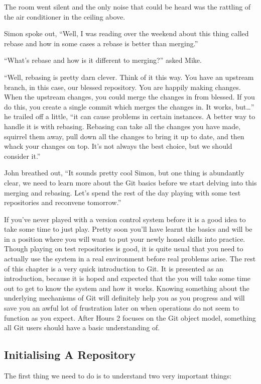 \begin{trenches}
The room went silent and the only noise that could be heard was the rattling of the air conditioner in the ceiling above.

Simon spoke out, ``Well, I was reading over the weekend about this thing called rebase and how in some cases a rebase is better than merging.''

``What's rebase and how is it different to merging?'' asked Mike.

``Well, rebasing is pretty darn clever. Think of it this way. You have an upstream branch, in this case, our blessed repository. You are happily making changes. When the upstream changes, you could merge the changes in from blessed. If you do this, you create a single commit which merges the changes in. It works, but\ldots'' he trailed off a little,
``it can cause problems in certain instances. A better way to handle it is with rebasing. Rebasing can take all the changes you have made, squirrel them away, pull down all the changes to bring it up to date, and then whack your changes on top.
It's not always the best choice, but we should consider it.''

John breathed out, ``It sounds pretty cool Simon, but one thing is abundantly clear, we need to learn more about the Git basics before we start delving into this merging and rebasing. Let's spend the rest of the day playing with some test repositories and reconvene tomorrow.''
\end{trenches}

If you've never played with a version control system before it is a good idea to take some time to just play.
Pretty soon you'll have learnt the basics and will be in a position where you will want to put your newly honed skills into practice.
Though playing on test repositories is good, it is quite usual that you need to actually use the system in a real environment before real problems arise.
The rest of this chapter is a very quick introduction to Git.
It is presented as an introduction, because it is hoped and expected that the you will take some time out to get to know the system and how it works.
Knowing something about the underlying mechanisms of Git will definitely help you as you progress and will save you an awful lot of frustration later on when operations do not seem to function as you expect.
After Hours 2 focuses on the Git object model, something all Git users should have a basic understanding of.

\subsection{Initialising A Repository}
The first thing we need to do is to understand two very important things:

